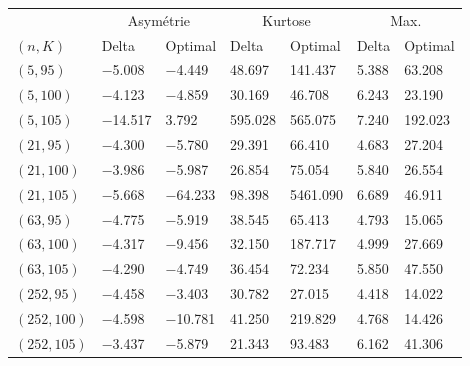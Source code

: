 \begin{tabular}{lllllll}
\toprule
& \multicolumn{2}{c}{Asymétrie} & \multicolumn{2}{c}{Kurtose} & \multicolumn{2}{c}{Max.}\\
$(n,K)$& Delta & Optimal & Delta & Optimal & Delta & Optimal\\
\midrule
$(5,95)$ & \num{-5.008} & \num{-4.449} & \num{48.697} & \num{141.437} & \num{5.388} & \num{63.208}\\
$(5,100)$ & \num{-4.123} & \num{-4.859} & \num{30.169} & \num{46.708} & \num{6.243} & \num{23.190}\\
$(5,105)$ & \num{-14.517} & \num{3.792} & \num{595.028} & \num{565.075} & \num{7.240} & \num{192.023}\\
$(21,95)$ & \num{-4.300} & \num{-5.780} & \num{29.391} & \num{66.410} & \num{4.683} & \num{27.204}\\
$(21,100)$ & \num{-3.986} & \num{-5.987} & \num{26.854} & \num{75.054} & \num{5.840} & \num{26.554}\\
$(21,105)$ & \num{-5.668} & \num{-64.233} & \num{98.398} & \num{5461.090} & \num{6.689} & \num{46.911}\\
$(63,95)$ & \num{-4.775} & \num{-5.919} & \num{38.545} & \num{65.413} & \num{4.793} & \num{15.065}\\
$(63,100)$ & \num{-4.317} & \num{-9.456} & \num{32.150} & \num{187.717} & \num{4.999} & \num{27.669}\\
$(63,105)$ & \num{-4.290} & \num{-4.749} & \num{36.454} & \num{72.234} & \num{5.850} & \num{47.550}\\
$(252,95)$ & \num{-4.458} & \num{-3.403} & \num{30.782} & \num{27.015} & \num{4.418} & \num{14.022}\\
$(252,100)$ & \num{-4.598} & \num{-10.781} & \num{41.250} & \num{219.829} & \num{4.768} & \num{14.426}\\
$(252,105)$ & \num{-3.437} & \num{-5.879} & \num{21.343} & \num{93.483} & \num{6.162} & \num{41.306}\\
\bottomrule
\end{tabular}
\\[3em]
